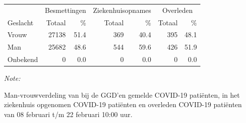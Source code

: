 \documentclass[
  english,
  man,floatsintext]{apa6}
\begin{document}
\begin{table}[H]
\centering\begingroup\fontsize{11}{13}\selectfont

\begin{threeparttable}
\begin{tabular}{lrrrrrr}
\toprule
\multicolumn{1}{c}{ } & \multicolumn{2}{c}{Besmettingen} & \multicolumn{2}{c}{Ziekenhuisopnames} & \multicolumn{2}{c}{Overleden} \\
\cmidrule(l{3pt}r{3pt}){2-3} \cmidrule(l{3pt}r{3pt}){4-5} \cmidrule(l{3pt}r{3pt}){6-7}
Geslacht & Totaal & \% & Totaal & \% & Totaal & \%\\
\midrule
Vrouw & 27138 & 51.4 & 369 & 40.4 & 395 & 48.1\\
Man & 25682 & 48.6 & 544 & 59.6 & 426 & 51.9\\
Onbekend & 0 & 0.0 & 0 & 0.0 & 0 & 0.0\\
\bottomrule
\end{tabular}
\begin{tablenotes}
\item \textit{Note: } 
\item Man-vrouwverdeling van bij de GGD’en gemelde COVID-19 patiënten, in het ziekenhuis opgenomen COVID-19 patiënten en overleden COVID-19 patiënten van 08 februari t/m 22 februari 10:00 uur.
\end{tablenotes}
\end{threeparttable}
\endgroup{}
\end{table}
\newpage
\end{document}
